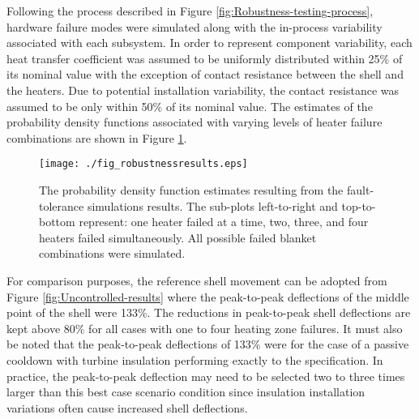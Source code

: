 \documentclass[a4paper, 10pt, conference]{ieeeconf}      %
\begin{document}
Following the process described in Figure \ref{fig:Robustness-testing-process}, hardware failure modes were simulated along with the in-process variability associated with each subsystem. In order to represent component variability, each heat transfer coefficient was assumed to be uniformly distributed within 25\% of its nominal value with the exception of contact resistance between the shell and the heaters. Due to potential installation variability, the contact resistance was assumed to be only within 50\% of its nominal value. The estimates of the probability density functions associated with varying levels of heater failure combinations are shown in Figure \ref{fig:Robustness-results}. 
\begin{figure}
\centering{}\texttt{[image: ./fig\_robustnessresults.eps]}
\caption{\label{fig:Robustness-results} The probability density function estimates resulting from the fault-tolerance simulations results. The sub-plots left-to-right and top-to-bottom represent: one heater failed at a time, two, three, and four heaters failed simultaneously. All possible failed blanket combinations were simulated.}
\end{figure} 
For comparison purposes, the reference shell movement can be adopted from Figure \ref{fig:Uncontrolled-results} where the peak-to-peak deflections of the middle point of the shell were 133\%. The reductions in peak-to-peak shell deflections are kept above 80\% for all cases with one to four heating zone failures. It must also be noted that the peak-to-peak deflections of 133\% were for the case of a passive cooldown with turbine insulation performing exactly to the specification. In practice, the peak-to-peak deflection may need to be selected two to three times larger than this best case scenario condition since insulation installation variations often cause increased shell deflections. 
\end{document}
